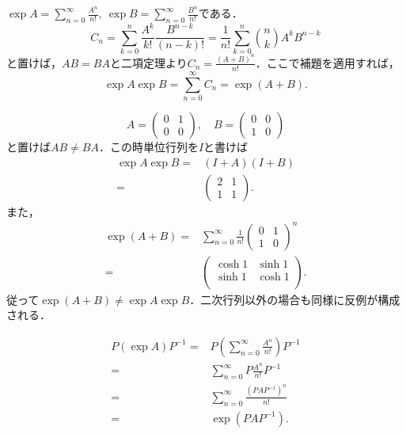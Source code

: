 \begin{tproof}
    $\exp A = \sum_{n=0}^\infty \frac{A^n}{n!},\ \exp B = \sum_{n=0}^\infty \frac{B^n}{n!}$である．
    \[
        C_n = \sum_{k = 0}^n \frac{A^k}{k!} \frac{B^{n-k}}{(n-k)!}
        = \frac{1}{n!} \sum_{k=0}^n \binom{n}{k} A^k B^{n-k}
    \]
    と置けば，$AB = BA$と二項定理より$C_n = \frac{(A + B)^n}{n!}$．ここで補題を適用すれば，
    \[
        \exp A \exp B = \sum_{n=0}^\infty C_n = \exp(A + B).
    \]
\end{tproof}


\begin{tproof}
    \[
        A =
        \begin{pmatrix}
            0 & 1 \\
            0 & 0
        \end{pmatrix}, \quad
        B =
        \begin{pmatrix}
            0 & 0 \\
            1 & 0
        \end{pmatrix}
    \]
    と置けば$AB \neq BA$．この時単位行列を$I$と書けば
    \begin{align*}
        \exp A \exp B ={} & (I + A) (I + B) \\
        ={}               &
        \begin{pmatrix}
            2 & 1 \\
            1 & 1
        \end{pmatrix}.
    \end{align*}
    また，
    \begin{align*}
        \exp(A + B) ={} & \sum_{n=0}^\infty \frac{1}{n!} \begin{pmatrix} 0 & 1 \\ 1 & 0\end{pmatrix}^n \\
        ={}             &
        \begin{pmatrix}
            \cosh 1 & \sinh 1 \\
            \sinh 1 & \cosh 1 \\
        \end{pmatrix}.
    \end{align*}
    従って$\exp(A + B) \neq \exp A \exp B$．二次行列以外の場合も同様に反例が構成される．
\end{tproof}



\begin{tproof}
    \begin{align*}
        P (\exp A)P^{-1} ={} & P\left(\sum_{n = 0}^\infty \frac{A^n}{n!}\right) P^{-1} \\
        ={}                  & \sum_{n = 0}^\infty P \frac{A^n}{n!} P^{-1}             \\
        ={}                  & \sum_{n = 0}^\infty \frac{(PAP^{-1})^n}{n!}             \\
        ={}                  & \exp(PAP^{-1}).
    \end{align*}
\end{tproof}


